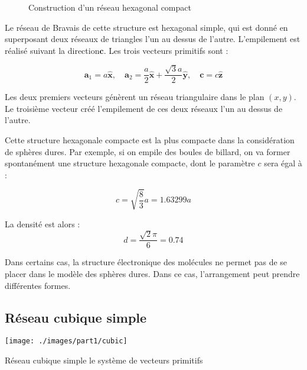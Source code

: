  \begin{figure}
     \hfill
    \caption{Construction d'un réseau hexagonal compact}
    \label{fig:hcp}
\end{figure}

Le réseau de Bravais de cette structure est hexagonal simple, qui est donné en
superposant deux réseaux de triangles l'un au dessus de l'autre. L'empilement est
réalisé suivant la direction$\mathbf{c}$. Les trois vecteurs primitifs sont :

\begin{equation}
    \mathbf{a}_1 = a \mathbf{\hat{x}},\quad \mathbf{a}_2 = \frac{a}{2}\mathbf{\hat{x}}+\frac{\sqrt{3}a}{2}\mathbf{\hat{y}},\quad \mathbf{c}= c\mathbf{\hat{z}}
\end{equation}

Les deux premiers vecteurs génèrent un réseau triangulaire dans le plan $(x,y)$. Le troisième vecteur créé l'empilement de ces deux réseaux l'un au dessus de l'autre.

Cette structure hexagonale compacte est la plus compacte dans la considération de sphères dures. Par exemple, si on empile des boules de billard, on va former spontanément une structure hexagonale compacte, dont le paramètre $c$ sera égal à :

\begin{equation}
    c = \sqrt{\frac{8}{3}}a = 1.63299 a
\end{equation}

La densité est alors :
\begin{equation}
d = \frac{\sqrt{2}\pi}{6} = 0.74
\end{equation}

Dans certains cas, la structure électronique des molécules ne permet pas de se placer dans le modèle des sphères dures. Dans ce cas, l'arrangement peut prendre différentes formes.

\subsection{Réseau cubique simple}

\begin{marginfigure}
    \texttt{[image: ./images/part1/cubic]}
    \caption{Réseau cubique simple le système de vecteurs primitifs}
    \label{fig:sc}
\end{marginfigure}

